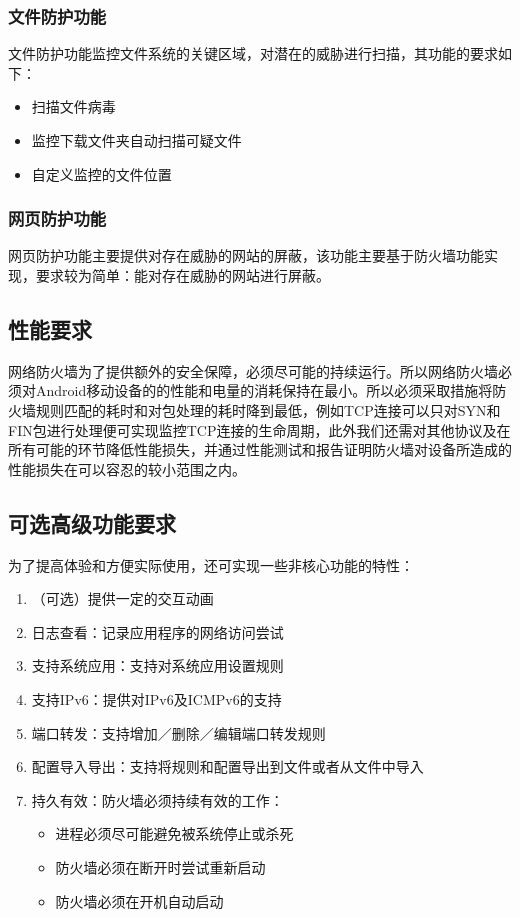 \documentclass[format=final, language=chinese, degree=fyp]{hustthesis}
\begin{document}
\subsubsection{文件防护功能}

文件防护功能监控文件系统的关键区域，对潜在的威胁进行扫描，其功能的要求如下：
\begin{itemize}
	\item 扫描文件病毒
	\item 监控下载文件夹自动扫描可疑文件
	\item 自定义监控的文件位置
\end{itemize}


\subsubsection{网页防护功能}

网页防护功能主要提供对存在威胁的网站的屏蔽，该功能主要基于防火墙功能实现，要求较为简单：能对存在威胁的网站进行屏蔽。

\subsection{性能要求}

网络防火墙为了提供额外的安全保障，必须尽可能的持续运行。所以网络防火墙必须对Android移动设备的的性能和电量的消耗保持在最小。所以必须采取措施将防火墙规则匹配的耗时和对包处理的耗时降到最低，例如TCP连接可以只对SYN和FIN包进行处理便可实现监控TCP连接的生命周期，此外我们还需对其他协议及在所有可能的环节降低性能损失，并通过性能测试和报告证明防火墙对设备所造成的性能损失在可以容忍的较小范围之内。

\subsection{可选高级功能要求}

为了提高体验和方便实际使用，还可实现一些非核心功能的特性：
\begin{enumerate}
	\item （可选）提供一定的交互动画
	\item 日志查看：记录应用程序的网络访问尝试
	\item 支持系统应用：支持对系统应用设置规则
	\item 支持IPv6：提供对IPv6及ICMPv6的支持
	\item 端口转发：支持增加／删除／编辑端口转发规则
	\item 配置导入导出：支持将规则和配置导出到文件或者从文件中导入
	\item 持久有效：防火墙必须持续有效的工作：
		\begin{itemize}
			\item 进程必须尽可能避免被系统停止或杀死
			\item 防火墙必须在断开时尝试重新启动
			\item 防火墙必须在开机自动启动
		\end{itemize}
\end{enumerate}
\end{document}
